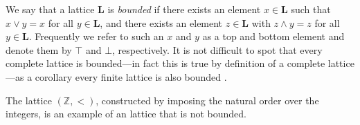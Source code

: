 We say that a lattice $\mathbf{L}$ is \textit{bounded} if there exists an element $x \in \mathbf{L}$ such that $x \vee y = x$ for all $y \in \mathbf{L}$, and there exists an element $z \in \mathbf{L}$ with $z \wedge y = z$ for all $y \in \mathbf{L}$. Frequently we refer to such an $x$ and $y$ as a top and bottom element and denote them by $\top$ and $\bot$, respectively. It is not difficult to spot that every complete lattice is bounded---in fact this is true by definition of a complete lattice---as a corollary every finite lattice is also bounded \cite[p. 36]{davey2002introduction}.

\begin{remark}
The lattice $(\mathbb{Z}, <)$, constructed by imposing the natural order over the integers, is an example of an lattice that is not bounded.
\end{remark}

